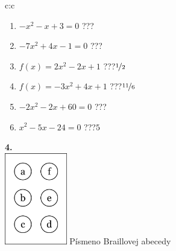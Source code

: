 \documentclass[10pt]{report}
\begin{document}
\begin{tabular}{c:c}
\begin{minipage}[c][104.5mm][t]{0.5\linewidth}
\begin{center}
\begin{minipage}{0.79\linewidth}
\begin{center}
\begin{varwidth}{\linewidth}
\begin{enumerate}
\Large
\item $-x^2-x+3=0$\quad \dotfill\; ???\;\dotfill {}
\item $-7x^2+4x-1=0$\quad \dotfill\; ???\;\dotfill {}
\item $f(x)=2x^2-2x+1$\quad \dotfill\; ???\;\dotfill \quad $\nicefrac{1}{2}$
\item $f(x)=-3x^2+4x+1$\quad \dotfill\; ???\;\dotfill \quad $\nicefrac{11}{6}$
\item $-2x^2-2x+60=0$\quad \dotfill\; ???\;\dotfill {}
\item $x^2-5x-24=0$\quad \dotfill\; ???\;\dotfill \quad $5$
\end{enumerate}
\end{varwidth}
\end{center}
\end{minipage}
\begin{minipage}{0.20\linewidth}
\begin{center}
{\Huge\bfseries 4.} \\[2mm]
\includegraphics[height=40mm]{../images/braille.png}
{\small Písmeno Braillovej abecedy}
\end{center}
\end{minipage}
\end{center}
\end{minipage}
%
\end{tabular}
\newpage
\thispagestyle{empty}
\end{document}

